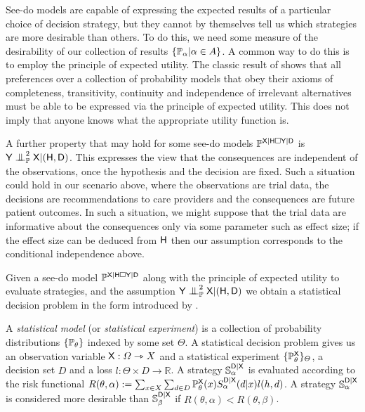 See-do models are capable of expressing the expected results of a particular choice of decision strategy, but they cannot by themselves tell us which strategies are more desirable than others. To do this, we need some measure of the desirability of our collection of results $\{\mathbb{P}_\alpha|\alpha\in A\}$. A common way to do this is to employ the principle of expected utility. The classic result of \citet{von_neumann_theory_1944} shows that all preferences over a collection of probability models that obey their axioms of completeness, transitivity, continuity and independence of irrelevant alternatives must be able to be expressed via the principle of expected utility. This does not imply that anyone knows what the appropriate utility function is.

A further property that may hold for some see-do models $\mathbb{P}^{\mathsf{X}|\mathsf{H}\square \mathsf{Y}|\mathsf{D}}$ is $\RV{Y}\CI^2_{\prob{P}} \RV{X}|(\RV{H},\RV{D})$. This expresses the view that the consequences are independent of the observations, once the hypothesis and the decision are fixed. Such a situation could hold in our scenario above, where the observations are trial data, the decisions are recommendations to care providers and the consequences are future patient outcomes. In such a situation, we might suppose that the trial data are informative about the consequences only via some parameter such as effect size; if the effect size can be deduced from $\mathsf{H}$ then our assumption corresponds to the conditional independence above.

Given a see-do model $\mathbb{P}^{\mathsf{X}|\mathsf{H}\square \mathsf{Y}|\mathsf{D}}$ along with the principle of expected utility to evaluate strategies, and the assumption $\RV{Y}\CI^2_{\prob{P}} \RV{X}|(\RV{H},\RV{D})$ we obtain a statistical decision problem in the form introduced by \citet{wald_statistical_1950}.

A \emph{statistical model} (or \emph{statistical experiment}) is a collection of probability distributions $\{\mathbb{P}_\theta\}$ indexed by some set $\Theta$. A statistical decision problem gives us an observation variable $\mathsf{X}:\Omega\rightarrowtriangle X$ and a statistical experiment $\{\mathbb{P}^{\mathsf{X}}_\theta\}_\Theta$, a decision set $D$ and a loss $l:\Theta\times D\to \mathbb{R}$. A strategy $\mathbb{S}^{\mathsf{D}|\mathsf{X}}_\alpha$ is evaluated according to the risk functional $R(\theta,\alpha):=\sum_{x\in X}\sum_{d\in D} \mathbb{P}^{\mathsf{X}}_\theta(x) S^{\mathsf{D}|\mathsf{X}}_\alpha (d|x) l(h,d)$. A strategy $\mathbb{S}^{\mathsf{D}|\mathsf{X}}_\alpha$ is considered more desirable than $\mathbb{S}^{\mathsf{D}|\mathsf{X}}_\beta$ if $R(\theta,\alpha)<R(\theta,\beta)$.

